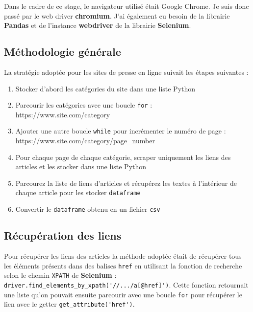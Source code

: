 \documentclass[a4paper,french,12pt]{article}
\begin{document}
Dans le cadre de ce stage, le navigateur utilisé était Google Chrome. Je suis donc passé par le web driver \textbf{chromium}. J'ai également eu besoin de la librairie \textbf{Pandas} et de l'instance \textbf{webdriver} de la librairie \textbf{Selenium}.

\subsection{Méthodologie générale}

\noindent
La stratégie adoptée pour les sites de presse en ligne suivait les étapes suivantes :\\

\begin{enumerate}
    \item Stocker d'abord les catégories du site dans une liste Python\\
    \item Parcourir les catégories avec une boucle \verb|for| :\\ https://www.site.com/category\\
    \item Ajouter une autre boucle \verb|while| pour incrémenter le numéro de page :\\
    https://www.site.com/category/page\_number\\
    \item Pour chaque page de chaque catégorie, scraper uniquement les liens des articles et les stocker dans une liste Python\\
    \item Parcourez la liste de liens d'articles et récupérez les textes à l'intérieur de chaque article pour les stocker \verb|dataframe|\\
    \item Convertir le \verb|dataframe| obtenu en un fichier \verb|csv|
\end{enumerate}

\subsection{Récupération des liens}

Pour récupérer les liens des articles la méthode adoptée était de récupérer tous les éléments présents dans des balises \verb|href| en utilisant la fonction de recherche selon le chemin \verb|XPATH| de \textbf{Selenium} : \verb|driver.find_elements_by_xpath('//.../a[@href]')|. Cette fonction retournait une liste qu'on pouvait ensuite parcourir avec une boucle \verb|for| pour récupérer le lien avec le getter \verb|get_attribute('href')|.\\
\end{document}
